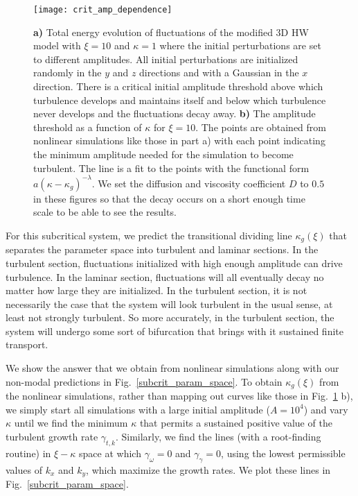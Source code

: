 \documentclass[twocolumn,showkeys,superscriptaddress]{revtex4}
\begin{document}
\begin{figure}
\centerline{\texttt{[image: crit\_amp\_dependence]}}
\caption{{\bf a)} Total energy evolution of fluctuations of the modified 3D HW model with $\xi=10$ and $\kappa=1$ where the initial perturbations are set to different amplitudes. 
All initial perturbations are initialized randomly in the $y$ and $z$ directions and with a Gaussian in the $x$ direction. 
There is a critical initial amplitude threshold above which turbulence develops and maintains itself and below which turbulence never develops and the fluctuations decay away. 
{\bf b)} The amplitude threshold as a function of $\kappa$ for $\xi=10$. The points are obtained from nonlinear simulations like those in part a) with each point indicating the minimum amplitude needed for the simulation
to become turbulent. The line is a fit to the points with the functional form $a (\kappa-\kappa_g)^{- \lambda}$.
We set the diffusion and viscosity coefficient $D$ to $0.5$ in these figures so that the decay occurs on a short enough time scale to be able to see the results.}
\label{crit_amp_dependence}
\end{figure}

For this subcritical system, we predict the transitional dividing line $\kappa_g(\xi)$ that separates the parameter space into turbulent and laminar sections. In the turbulent section, 
fluctuations initialized with high enough amplitude can drive turbulence. In the laminar section, fluctuations will all eventually decay no matter how large they are initialized. 
In the turbulent section, it is not necessarily the case that the system will look turbulent in the usual sense, at least not strongly turbulent.
So more accurately, in the turbulent section, the system will undergo some sort of bifurcation that brings with it sustained finite transport.

We show the answer that we obtain from nonlinear simulations along with our non-modal predictions in Fig.~\ref{subcrit_param_space}. To obtain $\kappa_g(\xi)$ from the nonlinear simulations,
rather than mapping out curves like those in Fig.~\ref{crit_amp_dependence} b), we simply start all simulations with a large initial amplitude ($A = 10^4$) and vary $\kappa$ until we find the minimum $\kappa$ that
permits a sustained positive value of the turbulent growth rate $\gamma_{t,k}$.
Similarly, we find the lines (with a root-finding routine) in $\xi-\kappa$ space at which $\gamma_{\omega} = 0$ and $\gamma_{\gamma} = 0$, using the lowest permissible values of $k_x$ and $k_y$, which maximize the growth rates. 
We plot these lines in Fig.~\ref{subcrit_param_space}.
\end{document}
